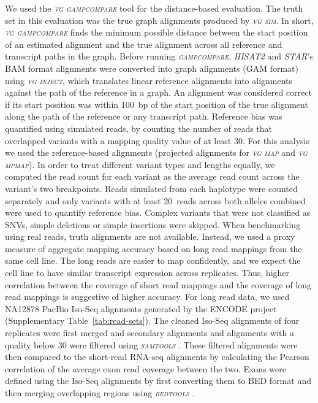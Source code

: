 \documentclass[11pt]{ucthesis}
\newcommand{\tool}[1]{\emph{\textsc{#1}}}
\begin{document}
We used the \tool{vg gampcompare} tool for the distance-based evaluation. The truth set in this evaluation was the true graph alignments produced by \tool{vg sim}. In short, \tool{vg gampcompare} finds the minimum possible distance between the start position of an estimated alignment and the true alignment across all reference and transcript paths in the graph. Before running \tool{gampcompare}, \tool{HISAT2} and \tool{STAR}'s BAM format alignments were converted into graph alignments (GAM format) using \tool{vg inject}, which translates linear reference alignments into alignments against the path of the reference in a graph. An alignment was considered correct if its start position was within 100~bp of the start position of the true alignment along the path of the reference or any transcript path.
\newline 
\newline
Reference bias was quantified using simulated reads, by counting the number of reads that overlapped variants with a mapping quality value of at least 30. For this analysis we used the reference-based alignments (projected alignments for \tool{vg map} and \tool{vg mpmap}). In order to treat different variant types and lengths equally, we computed the read count for each variant as the average read count across the variant's two breakpoints. Reads simulated from each haplotype were counted separately and only variants with at least 20~reads across both alleles combined were used to quantify reference bias. Complex variants that were not classified as SNVs, simple deletions or simple insertions were skipped. 
\newline 
\newline
When benchmarking using real reads, truth alignments are not available. Instead, we used a proxy measure of aggregate mapping accuracy based on long read mappings from the same cell line. The long reads are easier to map confidently, and we expect the cell line to have similar transcript expression across replicates. Thus, higher correlation between the coverage of short read mappings and the coverage of long read mappings is suggestive of higher accuracy. For long read data, we used NA12878 PacBio Iso-Seq alignments generated by the ENCODE project (Supplementary Table~\ref{tab:read-sets}). The cleaned Iso-Seq alignments of four replicates were first merged and secondary alignments and alignments with a quality below 30 were filtered using \tool{samtools} \cite{li2009sequence}. These filtered alignments were then compared to the short-read RNA-seq alignments by calculating the Pearson correlation of the average exon read coverage between the two. Exons were defined using the Iso-Seq alignments by first converting them to BED format and then merging overlapping regions using \tool{bedtools} \cite{quinlan2010bedtools}. 
\newline 
\newline
\end{document}
